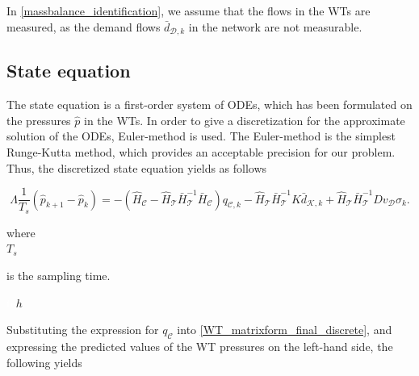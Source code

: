  In \eqref{massbalance_identification}, we assume that the flows in the WTs are measured, as the demand flows $\bar{d}_{\mathcal{D},k} $ in the network are not measurable. 


 \subsection{State equation}
\label{state_eq_identification} 

The state equation is a first-order system of ODEs, which has been formulated on the pressures $\hat{p}$ in the WTs. In order to give a discretization for the approximate solution of the ODEs, Euler-method is used. The Euler-method is the simplest Runge-Kutta method, which provides an acceptable precision for our problem\cite{chicone2006ordinary}. Thus, the discretized state equation yields as follows

\begin{equation}
  \label{WT_matrixform_final_discrete}
\Lambda \frac{1}{T_s} (\hat{p}_{k+1} - \hat{p}_k)  = - (\hat{H}_{\mathcal{C}} - \hat{H}_{\mathcal{T}} \bar{H}^{-1}_{\mathcal{T}}\bar{H}_{\mathcal{C}})  q_{\mathcal{C},k} - \hat{H}_{\mathcal{T}} \bar{H}^{-1}_{\mathcal{T}} K \bar{d}_{\mathcal{K},k} + \hat{H}_{\mathcal{T}} \bar{H}^{-1}_{\mathcal{T}} D v_{\mathcal{D}} \sigma_k.
\end{equation}

\begin{minipage}[t]{0.20\textwidth}
where\\
\hspace*{8mm} $T_s$
\end{minipage}
\begin{minipage}[t]{0.68\textwidth}
\vspace*{2mm}
 is the sampling time.
\end{minipage}
\begin{minipage}[t]{0.10\textwidth}
\vspace*{2mm}
\textcolor{White}{te}$\unit{h}$
\end{minipage} 

Substituting the expression for $q_{\mathcal{C}}$ into \eqref{WT_matrixform_final_discrete}, and expressing the predicted values of the WT pressures on the left-hand side, the following yields

